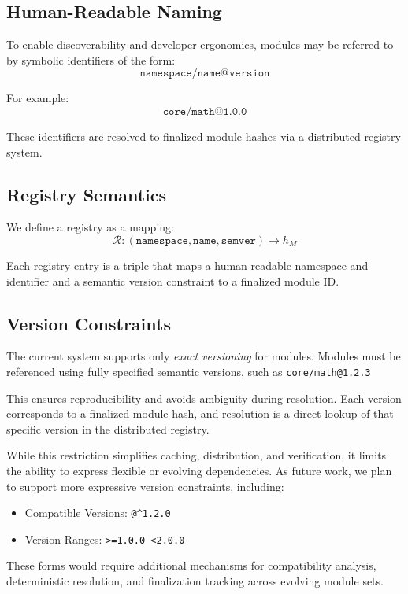 \documentclass[sigplan,screen]{acmart}
\begin{document}
\subsection{Human-Readable Naming}

To enable discoverability and developer ergonomics, modules may be referred to by symbolic identifiers of the form:
\[
\texttt{namespace/name@version}
\]

For example:
\[
\texttt{core/math@1.0.0}
\]

These identifiers are resolved to finalized module hashes via a distributed registry system.

\subsection{Registry Semantics}

We define a registry as a mapping:
\[
\mathcal{R}: (\texttt{namespace}, \texttt{name}, \texttt{semver}) \rightarrow h_M
\]

Each registry entry is a triple that maps a human-readable namespace and identifier and a semantic version constraint to a finalized module ID.

\subsection{Version Constraints}

The current system supports only \emph{exact versioning} for modules. Modules must be referenced using fully specified semantic versions, such as \texttt{core/math@1.2.3}

This ensures reproducibility and avoids ambiguity during resolution. Each version corresponds to a finalized module hash, and resolution is a direct lookup of that specific version in the distributed registry.

While this restriction simplifies caching, distribution, and verification, it limits the ability to express flexible or evolving dependencies. As future work, we plan to support more expressive version constraints, including:

\begin{itemize}
    \item Compatible Versions: \verb#@^1.2.0#
    \item Version Ranges: \texttt{>=1.0.0 <2.0.0}
\end{itemize}

These forms would require additional mechanisms for compatibility analysis, deterministic resolution, and finalization tracking across evolving module sets.
\end{document}
